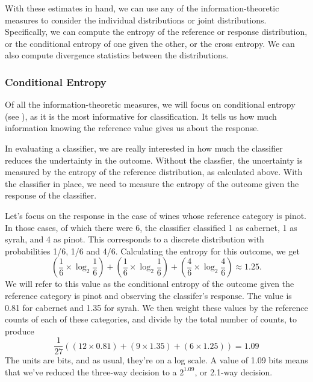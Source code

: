 With these estimates in hand, we can use any of the
information-theoretic measures to consider the individual
distributions or joint distributions.  Specifically, we can compute
the entropy of the reference or response distribution, or the
conditional entropy of one given the other, or the cross entropy.  We
can also compute divergence statistics between the distributions.

\subsubsection{Conditional Entropy}

Of all the information-theoretic measures, we will focus on
conditional entropy (see ), as it is
the most informative for classification.  It tells us how much
information knowing the reference value gives us about the response.

In evaluating a classifier, we are really interested in how much the
classifier reduces the undertainty in the outcome.  Without the classfier,
the uncertainty is measured by the entropy of the reference distribution,
as calculated above.  With the classifier in place, we need to measure
the entropy of the outcome given the response of the classifier.  

Let's focus on the response in the case of wines whose reference
category is pinot.  In those cases, of which there were 6, the
classifier classified 1 as cabernet, 1 as syrah, and 4 as pinot.  
This corresponds to a discrete distribution with probabilities
1/6, 1/6 and 4/6.  Calculating the entropy for this outcome, we
get
%
\begin{equation}
\left( \frac{1}{6} \times \log_2 \frac{1}{6} \right)
+ \left( \frac{1}{6} \times \log_2 \frac{1}{6} \right)
+ \left( \frac{4}{6} \times \log_2 \frac{4}{6} \right)
\approx 1.25.
\end{equation}
%
We will refer to this value as the conditional entropy of the outcome
given the reference category is pinot and observing the classifer's
response.  The value is 0.81 for cabernet and 1.35 for syrah.
We then weight these values by the reference counts of each of these
categories, and divide by the total number of counts, to produce
%
\begin{equation}
\frac{1}{27} \left( (12 \times 0.81) + (9 \times 1.35) + (6 \times 1.25) \right) = 1.09
\end{equation}
%
The units are bits, and as usual, they're on a log scale.  A value of
1.09 bits means that we've reduced the three-way decision to a
$2^{1.09}$, or 2.1-way decision.  

